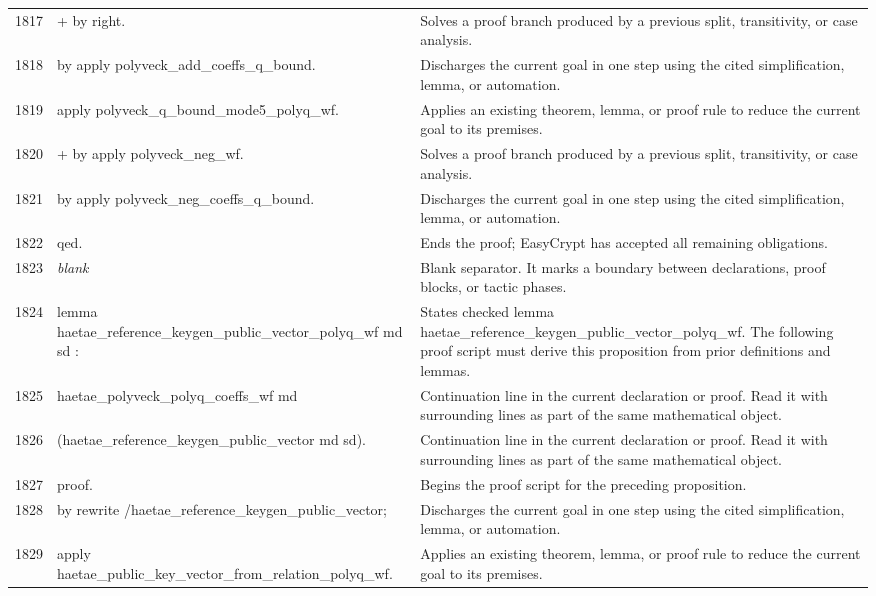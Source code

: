 \documentclass[10pt]{article}
\begin{document}
\begin{longtable}{r L{0.53\textwidth} L{0.37\textwidth}}
1817 & {\ttfamily\scriptsize   + by right.} & Solves a proof branch produced by a previous split, transitivity, or case analysis. \\
1818 & {\ttfamily\scriptsize   by apply polyveck\_add\_coeffs\_q\_bound.} & Discharges the current goal in one step using the cited simplification, lemma, or automation. \\
1819 & {\ttfamily\scriptsize apply polyveck\_q\_bound\_mode5\_polyq\_wf.} & Applies an existing theorem, lemma, or proof rule to reduce the current goal to its premises. \\
1820 & {\ttfamily\scriptsize + by apply polyveck\_neg\_wf.} & Solves a proof branch produced by a previous split, transitivity, or case analysis. \\
1821 & {\ttfamily\scriptsize by apply polyveck\_neg\_coeffs\_q\_bound.} & Discharges the current goal in one step using the cited simplification, lemma, or automation. \\
1822 & {\ttfamily\scriptsize qed.} & Ends the proof; EasyCrypt has accepted all remaining obligations. \\
1823 & {\ttfamily\scriptsize \emph{blank}} & Blank separator.  It marks a boundary between declarations, proof blocks, or tactic phases. \\
1824 & {\ttfamily\scriptsize lemma haetae\_reference\_keygen\_public\_vector\_polyq\_wf md sd :} & States checked lemma haetae\_reference\_keygen\_public\_vector\_polyq\_wf.  The following proof script must derive this proposition from prior definitions and lemmas. \\
1825 & {\ttfamily\scriptsize   haetae\_polyveck\_polyq\_coeffs\_wf md} & Continuation line in the current declaration or proof.  Read it with surrounding lines as part of the same mathematical object. \\
1826 & {\ttfamily\scriptsize     (haetae\_reference\_keygen\_public\_vector md sd).} & Continuation line in the current declaration or proof.  Read it with surrounding lines as part of the same mathematical object. \\
1827 & {\ttfamily\scriptsize proof.} & Begins the proof script for the preceding proposition. \\
1828 & {\ttfamily\scriptsize by rewrite /haetae\_reference\_keygen\_public\_vector;} & Discharges the current goal in one step using the cited simplification, lemma, or automation. \\
1829 & {\ttfamily\scriptsize    apply haetae\_public\_key\_vector\_from\_relation\_polyq\_wf.} & Applies an existing theorem, lemma, or proof rule to reduce the current goal to its premises. \\

\end{longtable}
\end{document}
